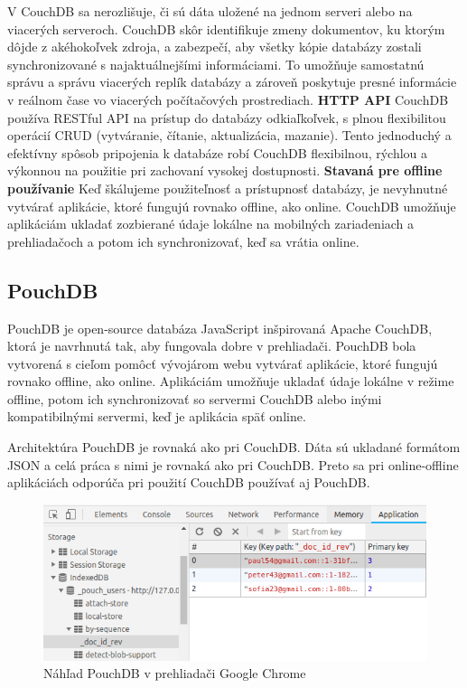 \indent V CouchDB sa nerozlišuje, či sú dáta uložené na jednom serveri alebo na viacerých serveroch. CouchDB skôr identifikuje zmeny dokumentov, ku ktorým dôjde z akéhokoľvek zdroja, a zabezpečí, aby všetky kópie databázy zostali synchronizované s najaktuálnejšími informáciami. To umožňuje samostatnú správu a správu viacerých replík databázy a zároveň poskytuje presné informácie v reálnom čase vo viacerých počítačových prostrediach.\newpage
\noindent\textbf{HTTP API} \newline
\indent CouchDB používa RESTful API na prístup do databázy odkiaľkoľvek, s plnou flexibilitou operácií CRUD (vytváranie, čítanie, aktualizácia, mazanie). Tento jednoduchý a efektívny spôsob pripojenia k databáze robí CouchDB flexibilnou, rýchlou a výkonnou na použitie pri zachovaní vysokej dostupnosti.\newline
\textbf{Stavaná pre offline používanie} \newline
\indent Keď škálujeme použiteľnosť a prístupnosť databázy, je nevyhnutné vytvárať aplikácie, ktoré fungujú rovnako offline, ako online. CouchDB umožňuje aplikáciám ukladať zozbierané údaje lokálne na mobilných zariadeniach a prehliadačoch a potom ich synchronizovať, keď sa vrátia online.

\subsection{PouchDB}
\indent PouchDB je open-source databáza JavaScript inšpirovaná Apache CouchDB, ktorá je navrhnutá tak, aby fungovala dobre v prehliadači. PouchDB bola vytvorená s cieľom pomôcť vývojárom webu vytvárať aplikácie, ktoré fungujú rovnako offline, ako online. Aplikáciám umožňuje ukladať údaje lokálne v režime offline, potom ich synchronizovať so servermi CouchDB alebo inými kompatibilnými servermi, keď je aplikácia späť online.

\indent Architektúra PouchDB je rovnaká ako pri CouchDB. Dáta sú ukladané formátom JSON a celá práca s nimi je rovnaká ako pri CouchDB. Preto sa pri online-offline aplikáciách odporúča pri použití CouchDB používať aj PouchDB.

\begin{figure}[H]
    \centering
    \includegraphics[scale=0.80]{img/pouchdb.png}
    \caption{Náhľad PouchDB v prehliadači Google Chrome}
    \label{fig:pouch_db}
\end{figure}

